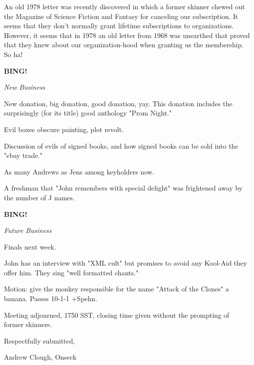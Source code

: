 \documentclass[12pt]{article}
\newcommand{\bing}{{\bf BING!} }
\newcommand{\goto}[1]{\bing \vskip 12pt \centerline{{\em{#1}}}}
\begin{document}
An old 1978 letter was recently discovered in which a former skinner chewed out the Magazine of Science Fiction and Fantasy for canceling our subscription. It seems that they don't normally grant lifetime subscriptions to organizations. However, it seems that in 1978 an old letter from 1968 was unearthed that proved that they knew about our organization-hood when granting us the membership. So ha!

\goto{New Business}

New donation, big donation, good donation, yay. This donation includes the surprisingly (for its title) good anthology "Prom Night."

Evil boxes obscure painting, plot revolt.

Discussion of evils of signed books, and how signed books can be sold into the "ebay trade."

As many Andrews as Jens among keyholders now.

A freshman that "John remembers with special delight" was frightened away by the number of J names.

\goto{Future Business}

Finals next week.

John has an interview with "XML cult" but promises to avoid any Kool-Aid they offer him. They sing "well formatted chants."

Motion: give the monkey responsible for the name "Attack of the Clones" a banana. Passes 10-1-1 +Spehn.

\vspace{12pt}

\noindent
Meeting adjourned, 1750 SST, closing time given without the prompting of former skinners.

\vspace{18pt}

\centerline{Respectfully submitted,}
\centerline{Andrew Clough, Onseck}
\end{document}
